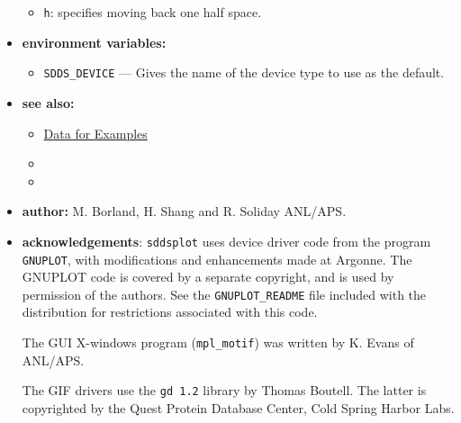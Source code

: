 \begin{itemize}
\begin{itemize}
\item {\tt h}: specifies moving back one half space.
\end{itemize}


\item {\bf environment variables:}
        \begin{itemize}
        \item {\tt SDDS\_DEVICE} --- Gives the name of the device type to use as the default.
        \end{itemize}
\item {\bf see also:}
    \begin{itemize}
    \item \hyperref[exampleData]{Data for Examples}
    \item {}
    \item {}
    \end{itemize}
\item {\bf author:} M. Borland, H. Shang and R. Soliday ANL/APS.

\item {\bf acknowledgements}: {\tt sddsplot} uses device driver code from the program {\tt GNUPLOT}, 
with modifications and enhancements made at Argonne.  The GNUPLOT code is covered by a separate
copyright, and is used by permission of the authors.  See the {\tt GNUPLOT\_README} file included
with the distribution for restrictions associated with this code.

The GUI X-windows program ({\tt mpl\_motif}) was written by K. Evans of ANL/APS.

The GIF drivers use the {\tt gd 1.2} library by Thomas Boutell.  The latter is copyrighted by the
Quest Protein Database Center, Cold Spring Harbor Labs.

\end{itemize}


